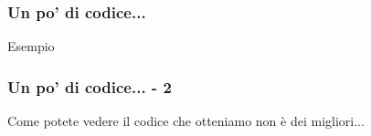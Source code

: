 \begin{frame}[fragile]
  \frametitle{Un po' di codice...}
  
  \begin{exampleblock}{Esempio}
    
  \end{exampleblock}
\end{frame}

\begin{frame}
 
 \frametitle{Un po' di codice... - 2}
 
 Come potete vedere il codice che otteniamo non è dei migliori...
\end{frame}
